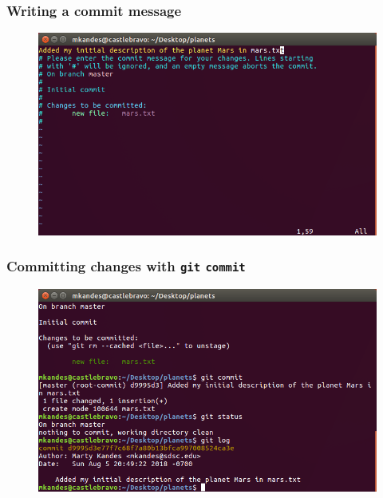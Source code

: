 \documentclass{beamer}
\begin{document}
\begin{frame}
   \frametitle{Writing a commit message}
   \begin{figure}[htbp]
      \includegraphics[width=1.0\textwidth]{images/git-commit-message.png}
   \end{figure}
\end{frame}

\begin{frame}
   \frametitle{Committing changes with \texttt{git} \texttt{commit}}
   \begin{figure}[htbp]
      \includegraphics[width=1.0\textwidth]{images/git-after-commit.png}
   \end{figure}
\end{frame}
\end{document}
